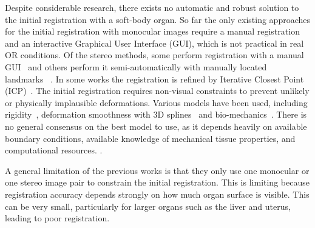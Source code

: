 Despite considerable research, there exists no automatic and robust solution to the initial registration with a soft-body organ. 
So far the only existing approaches for the initial registration with monocular images require a manual registration~\cite{affineTracking} and an interactive Graphical User Interface (GUI), which is not practical in real OR conditions.
Of the stereo methods, some perform registration with a manual GUI~\cite{Cohen2010Prostate,haouchine13} and others perform it semi-automatically with manually located landmarks~\cite{21142942,conf/miccai/Amir-KhaliliNPHA13,hamarneh2014igrs,Su2009} .
In some works the registration is refined by Iterative Closest Point (ICP)~\cite{hamarneh2014igrs,Su2009}. %
The initial registration requires non-visual constraints to prevent unlikely or physically implausible deformations. Various models have been used, including rigidity~\cite{Su2009}, deformation smoothness with 3D splines~\cite{conf/miccai/Amir-KhaliliNPHA13} and bio-mechanics~\cite{hamarneh2014igrs,haouchine13,Reichard2017}.
There is no general consensus on the best model to use, as it depends heavily on available boundary conditions, available knowledge of mechanical tissue properties, and computational resources.
.

A general limitation of the previous works is that they only use one monocular or one stereo image pair to constrain the initial registration.
This is limiting because registration accuracy depends strongly on how much organ surface is visible. 
This can be very small, particularly for larger organs such as the liver and uterus, leading to poor registration.


